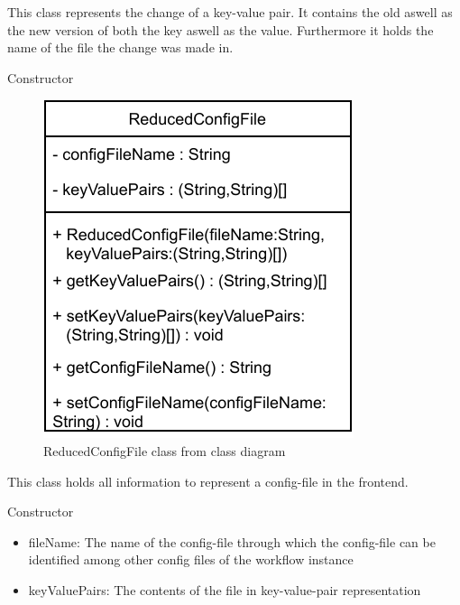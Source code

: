 This class represents the change of a key-value pair. It contains the old aswell as the new version of both the key aswell as the value. Furthermore it holds the name of the file the change was made in.

\begin{methodenv}{Constructor}


\end{methodenv}


\begin{figure}[h]
\centerline{\includegraphics[scale=1]{res/Klassen/ReducedConfigFile.pdf}}
\caption{ReducedConfigFile class from class diagram}
\end{figure}

This class holds all information to represent a config-file in the frontend.

\begin{methodenv}{Constructor}


\begin{itemize}
	\item{fileName:}
	The name of the config-file through which the config-file can be identified among other config files of the workflow instance
	\item{keyValuePairs:}
	The contents of the file in key-value-pair representation
\end{itemize}
\end{methodenv}

